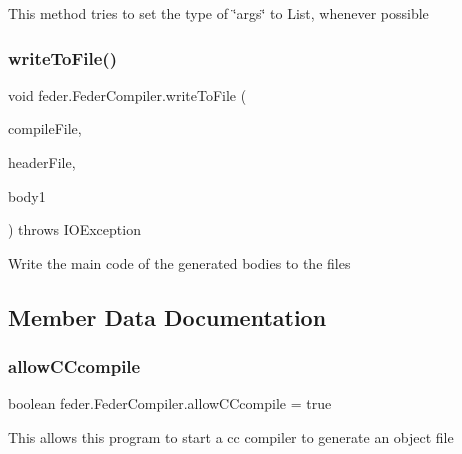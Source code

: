 This method tries to set the type of \char`\"{}args\char`\"{} to List, whenever possible \mbox{\label{classfeder_1_1FederCompiler_a4e72abbcf700edf0f31ce2aea2605cb9}} 
\subsubsection{\texorpdfstring{write\+To\+File()}{writeToFile()}}
{\footnotesize\ttfamily void feder.\+Feder\+Compiler.\+write\+To\+File (\begin{DoxyParamCaption}\item[{Buffered\+Writer}]{compile\+File,  }\item[{Buffered\+Writer}]{header\+File,  }\item[{\hyperlink{classfeder_1_1types_1_1FederBinding}{Feder\+Binding}}]{body1 }\end{DoxyParamCaption}) throws I\+O\+Exception}

Write the main code of the generated bodies to the files 

\subsection{Member Data Documentation}
\mbox{\label{classfeder_1_1FederCompiler_a41515b8539e22e6899993b574a10e203}} 
\subsubsection{\texorpdfstring{allow\+C\+Ccompile}{allowCCcompile}}
{\footnotesize\ttfamily boolean feder.\+Feder\+Compiler.\+allow\+C\+Ccompile = true}

This allows this program to start a cc compiler to generate an object file \mbox{\label{classfeder_1_1FederCompiler_a5ee5791f203fe9785e84558b0ca1eb51}} 
